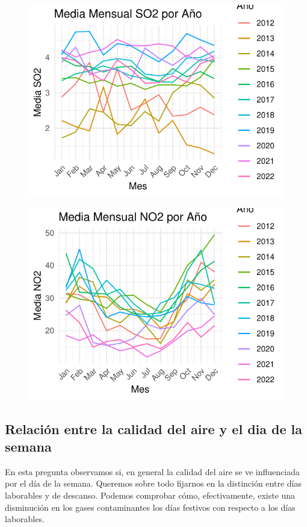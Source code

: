\documentclass[notspecified,article,submit,moreauthors,pdftex]{Definitions/mdpi}
\begin{document}
\begin{figure}

\includegraphics[width=0.7\linewidth]{ProyectoAED2023_files/figure-latex/pregunta1_1-1} \hfill{}

\caption{\label{fig:pregunta1_1}}\label{fig:pregunta1_1}
\end{figure}

\begin{figure}

\includegraphics[width=0.7\linewidth]{ProyectoAED2023_files/figure-latex/pregunta1_2-1} \hfill{}

\caption{\label{fig:pregunta1_2}}\label{fig:pregunta1_2}
\end{figure}

\hypertarget{relaciuxf3n-entre-la-calidad-del-aire-y-el-dia-de-la-semana}{%
\subsection{Relación entre la calidad del aire y el dia de la
semana}\label{relaciuxf3n-entre-la-calidad-del-aire-y-el-dia-de-la-semana}}

En esta pregunta observamos si, en general la calidad del aire se ve
influenciada por el día de la semana. Queremos sobre todo fijarnos en la
distinción entre días laborables y de descanso. Podemos comprobar cómo,
efectivamente, existe una disminución en los gases contaminantes los
días festivos con respecto a los días laborables.
\end{document}
